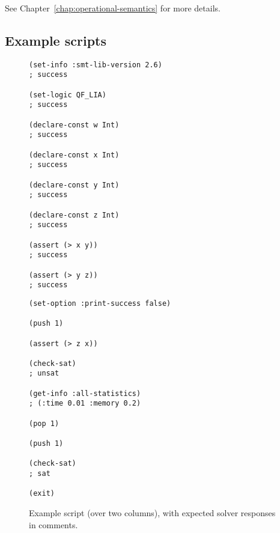 \noindent See Chapter~\ref{chap:operational-semantics} for more details.


\subsection{Example scripts}

\begin{figure}
\footnotesize
\begin{minipage}[t]{.5\linewidth}
\begin{verbatim}
(set-info :smt-lib-version 2.6)
; success

(set-logic QF_LIA)
; success

(declare-const w Int)
; success

(declare-const x Int)
; success

(declare-const y Int)
; success

(declare-const z Int)
; success

(assert (> x y))
; success

(assert (> y z))
; success
\end{verbatim}
\end{minipage}
%
\begin{minipage}[t]{.5\linewidth}
\begin{verbatim}
(set-option :print-success false)

(push 1)

(assert (> z x))

(check-sat)
; unsat

(get-info :all-statistics) 
; (:time 0.01 :memory 0.2)

(pop 1)

(push 1)

(check-sat)
; sat

(exit)
\end{verbatim}
\end{minipage}
\medskip

\caption{\label{fig:eg1}Example script (over two columns), with expected solver responses in comments.}
\end{figure}


